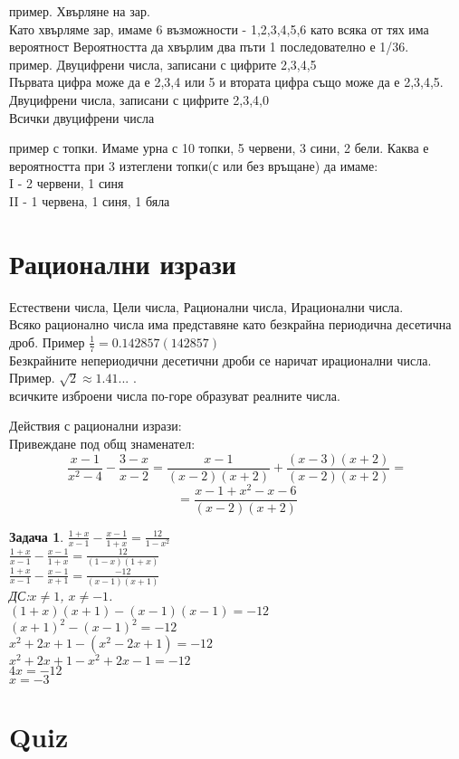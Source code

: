\documentclass{article}
\theoremstyle{plain}
\newtheorem{problem}{Задача}
\begin{document}
	пример. Хвърляне на зар.\\
	Като хвърляме зар, имаме 6 възможности - 1,2,3,4,5,6 като всяка от тях има вероятност  %
	Вероятността да хвърлим два пъти 1 последователно е 1/36.\\
	пример. Двуцифрени числа, записани с цифрите 2,3,4,5\\
	
	Първата цифра може да е 2,3,4 или 5 и втората цифра също може да е 2,3,4,5.
	\\
	
 Двуцифрени числа, записани с цифрите 2,3,4,0\\
 Всички двуцифрени числа

пример с топки. Имаме урна с 10 топки, 5 червени, 3 сини, 2 бели. Каква е вероятността при 3 изтеглени топки(с или без връщане) да имаме:\\
I - 2 червени, 1 синя\\
II -  1 червена, 1 синя, 1 бяла



\section{Рационални изрази}
Естествени числа, Цели числа, Рационални числа, Ирационални числа.\\
Всяко рационално числа има представяне като безкрайна периодична десетична дроб.
Пример $\frac{1}{7} = 0.142857(142857) $ \\
Безкрайните непериодични десетични дроби се наричат ирационални числа.
Пример. $ \sqrt 2 \approx 1.41...$ . \\
всичките изброени числа по-горе образуват реалните числа.

Действия с рационални изрази:\\
Привеждане под общ знаменател: \\
$$\frac{x-1}{x^2-4} - \frac{3-x}{x-2} = \frac{x-1}{(x-2)(x+2)} + \frac{(x-3)(x+2)}{(x-2)(x+2)} =  $$
$$ = \frac{x-1 + x^2 - x - 6 }{(x-2)(x+2)}  $$

\begin{problem}
	$\frac{1+x}{x-1} - \frac{x-1}{1+x} = \frac{12}{1-x^2}$ \\
	$\frac{1+x}{x-1} - \frac{x-1}{1+x} = \frac{12}{(1-x)(1+x)}$ \\
	$\frac{1+x}{x-1} - \frac{x-1}{x+1} = \frac{-12}{(x-1)(x+1)}$ \\
    ДС:$x \neq 1  $, $x \neq -1 $. \\
    $(1+x)(x+1) - (x-1)(x-1) = -12 $\\
    $(x+1)^2 - (x-1)^2 = -12 $ \\
    $x^2 + 2x + 1 -(x^2 - 2x +1) = -12  $ \\
    $x^2 + 2x + 1 -x^2 + 2x -1 = -12 $ \\
    $4x = -12 $\\
    $ x = -3$ 
    
    
\end{problem}




\section{Quiz}
\end{document}

